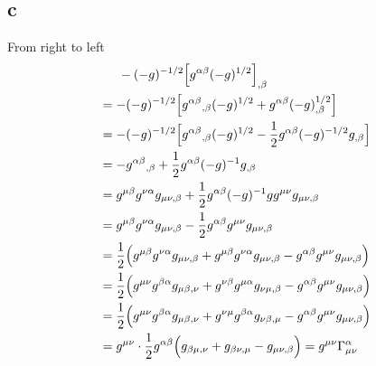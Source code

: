 \documentclass{article}
\begin{document}
\subsection*{c}
From right to left
\begin{align*}
&\indent -(-g)^{-1/2}\Big[g^{\alpha\beta}(-g)^{1/2}\Big]_{,\beta} \\
&= -(-g)^{-1/2}\Big[g^{\alpha\beta}{}_{,\beta}(-g)^{1/2} + g^{\alpha\beta}(-g)^{1/2}_{,\beta} \Big]\\
&= -(-g)^{-1/2}\Big[g^{\alpha\beta}{}_{,\beta}(-g)^{1/2} - \frac{1}{2}g^{\alpha\beta}(-g)^{-1/2}g_{,\beta} \Big]\\
&= - g^{\alpha\beta}{}_{,\beta} + \frac{1}{2}g^{\alpha\beta}(-g)^{-1}g_{,\beta}\\
&= g^{\mu\beta}g^{\nu\alpha}g_{\mu\nu,\beta} + \frac{1}{2}g^{\alpha\beta}(-g)^{-1}gg^{\mu\nu}g_{\mu\nu,\beta}\\
&= g^{\mu\beta}g^{\nu\alpha}g_{\mu\nu,\beta} - \frac{1}{2}g^{\alpha\beta}g^{\mu\nu}g_{\mu\nu,\beta}\\
&= \frac{1}{2}\Big(g^{\mu\beta}g^{\nu\alpha}g_{\mu\nu,\beta}  + g^{\mu\beta}g^{\nu\alpha}g_{\mu\nu,\beta} - g^{\alpha\beta}g^{\mu\nu}g_{\mu\nu,\beta} \Big) \\
&= \frac{1}{2}\Big(g^{\mu\nu}g^{\beta\alpha}g_{\mu\beta, \nu}  + g^{\nu\beta}g^{\mu\alpha}g_{\nu\mu,\beta} - g^{\alpha\beta}g^{\mu\nu}g_{\mu\nu,\beta} \Big) \\
&= \frac{1}{2}\Big(g^{\mu\nu}g^{\beta\alpha}g_{\mu\beta, \nu}  + g^{\nu\mu}g^{\beta\alpha}g_{\nu\beta,\mu} - g^{\alpha\beta}g^{\mu\nu}g_{\mu\nu,\beta} \Big) \\
&= g^{\mu\nu}\cdot \frac{1}{2}g^{\alpha\beta} \Big(g_{\beta\mu, \nu}  +g_{\beta\nu,\mu} - g_{\mu\nu,\beta} \Big)
= g^{\mu\nu} \Gamma^\alpha_{\mu\nu}
\end{align*}
\end{document}
